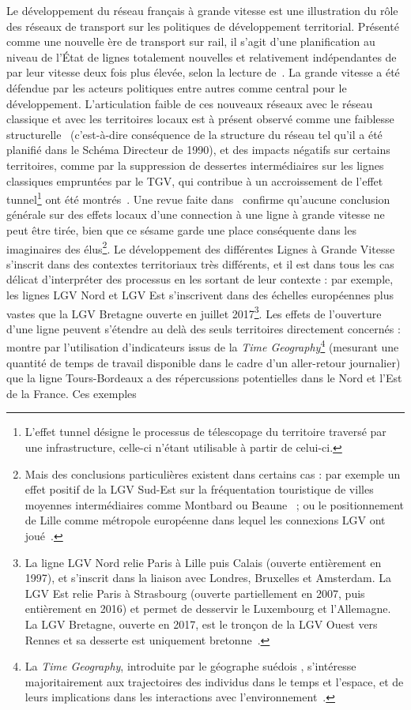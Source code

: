 {Le développement du réseau français à grande vitesse est une illustration du rôle des réseaux de transport sur les politiques de développement territorial. Présenté comme une nouvelle ère de transport sur rail, il s'agit d'une planification au niveau de l'État de lignes totalement nouvelles et relativement indépendantes de par leur vitesse deux fois plus élevée, selon la lecture de~\cite{zembri1997fondements}. La grande vitesse a été défendue par les acteurs politiques entre autres comme central pour le développement. L'articulation faible de ces nouveaux réseaux avec le réseau classique et avec les territoires locaux est à présent observé comme une faiblesse structurelle~\cite{zembri1997fondements} (c'est-à-dire conséquence de la structure du réseau tel qu'il a été planifié dans le Schéma Directeur de 1990), et des impacts négatifs sur certains territoires, comme par la suppression de dessertes intermédiaires sur les lignes classiques empruntées par le TGV, qui contribue à un accroissement de l'effet tunnel\footnote{L'effet tunnel désigne le processus de télescopage du territoire traversé par une infrastructure, celle-ci n'étant utilisable à partir de celui-ci.} ont été montrés~\cite{zembri2008contribution}. Une revue faite dans~\cite{bazin2011grande} confirme qu'aucune conclusion générale sur des effets locaux d'une connection à une ligne à grande vitesse ne peut être tirée, bien que ce sésame garde une place conséquente dans les imaginaires des élus\footnote{Mais des conclusions particulières existent dans certains cas : par exemple un effet positif de la LGV Sud-Est sur la fréquentation touristique de villes moyennes intermédiaires comme Montbard ou Beaune~\cite{bonnafous1987regional} ; ou le positionnement de Lille comme métropole européenne dans lequel les connexions LGV ont joué~\cite{giblin2004lille}.}. Le développement des différentes Lignes à Grande Vitesse s'inscrit dans des contextes territoriaux très différents, et il est dans tous les cas délicat d'interpréter des processus en les sortant de leur contexte : par exemple, les lignes LGV Nord et LGV Est s'inscrivent dans des échelles européennes plus vastes que la LGV Bretagne ouverte en juillet 2017\footnote{La ligne LGV Nord relie Paris à Lille puis Calais (ouverte entièrement en 1997), et s'inscrit dans la liaison avec Londres, Bruxelles et Amsterdam. La LGV Est relie Paris à Strasbourg (ouverte partiellement en 2007, puis entièrement en 2016) et permet de desservir le Luxembourg et l'Allemagne. La LGV Bretagne, ouverte en 2017, est le tronçon de la LGV Ouest vers Rennes et sa desserte est uniquement bretonne~\cite{zembri2010new}.}. Les effets de l'ouverture d'une ligne peuvent s'étendre au delà des seuls territoires directement concernés : \cite{l2014contribution} montre par l'utilisation d'indicateurs issus de la \emph{Time Geography}\footnote{La \emph{Time Geography}, introduite par le géographe suédois , s'intéresse majoritairement aux trajectoires des individus dans le temps et l'espace, et de leurs implications dans les interactions avec l'environnement~\cite{chardonnel2007time}.} (mesurant une quantité de temps de travail disponible dans le cadre d'un aller-retour journalier) que la ligne Tours-Bordeaux a des répercussions potentielles dans le Nord et l'Est de la France. Ces exemples }
